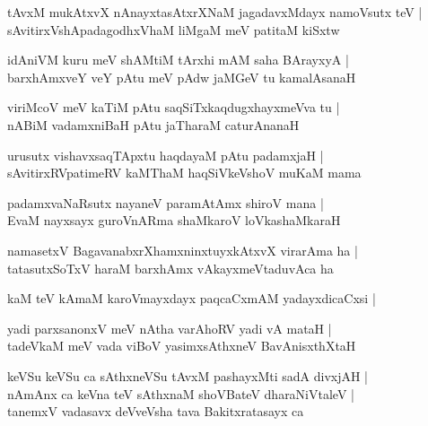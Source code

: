 \begin{shloka}
tAvxM mukAtxvX nAnayxtasAtxrXNaM jagadavxMdayx namoVsutx teV |\\
sAvitirxVshApadagodhxVhaM liMgaM meV patitaM kiSxtw
\end{shloka}

\begin{shloka}
idAniVM kuru meV shAMtiM tArxhi mAM saha BArayxyA |\\
barxhAmxveY veY pAtu meV pAdw jaMGeV tu kamalAsanaH 
\end{shloka}

\begin{shloka}
viriMcoV meV kaTiM pAtu saqSiTxkaqdugxhayxmeVva tu |\\
nABiM vadamxniBaH pAtu jaTharaM caturAnanaH 
\end{shloka}

\begin{shloka}
urusutx vishavxsaqTApxtu haqdayaM pAtu padamxjaH |\\
sAvitirxRVpatimeRV kaMThaM haqSiVkeVshoV muKaM mama
\end{shloka}

\begin{shloka}
padamxvaNaRsutx nayaneV paramAtAmx shiroV mana |\\
EvaM nayxsayx guroVnARma shaMkaroV loVkashaMkaraH 
\end{shloka}

\begin{shloka}
namasetxV BagavanabxrXhamxninxtuyxkAtxvX virarAma ha |\\
tatasutxSoTxV haraM barxhAmx vAkayxmeVtaduvAca ha
\end{shloka}

\begin{shloka}
kaM teV kAmaM karoVmayxdayx paqcaCxmAM yadayxdicaCxsi |
\end{shloka}

\begin{shloka}
yadi parxsanonxV meV nAtha varAhoRV yadi vA mataH |\\
tadeVkaM meV vada viBoV yasimx\R sAthxneV BavAnisxthXtaH
\end{shloka}

\begin{shloka}
keVSu keVSu ca sAthxneVSu tAvxM pashayxMti sadA divxjAH |\\
nAmAnx ca keVna teV sAthxnaM shoVBateV dharaNiVtaleV |\\
tanemxV vadasavx deVveVsha tava Bakitxratasayx ca 
\end{shloka}

